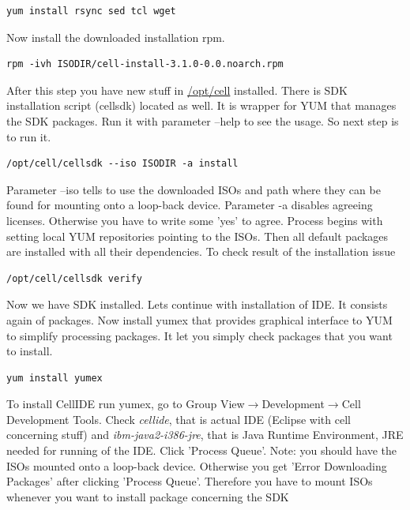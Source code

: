 \begin{verbatim}
yum install rsync sed tcl wget
\end{verbatim}

Now install the downloaded installation rpm.

\begin{verbatim}
rpm -ivh ISODIR/cell-install-3.1.0-0.0.noarch.rpm
\end{verbatim}

After this step you have new stuff in \url{/opt/cell} installed. There is SDK installation script (cellsdk) located as well.
It is wrapper for YUM that manages the SDK packages.
Run it with parameter --help to see the usage.
So next step is to run it.

\begin{verbatim}
/opt/cell/cellsdk --iso ISODIR -a install
\end{verbatim}

Parameter --iso tells to use the downloaded ISOs and path where they can be found for mounting onto a loop-back device.
Parameter -a disables agreeing licenses.
Otherwise you have to write some 'yes' to agree.
Process begins with setting local YUM repositories pointing to the ISOs.
Then all default packages are installed with all their dependencies.
To check result of the installation issue

\begin{verbatim}
/opt/cell/cellsdk verify
\end{verbatim}

Now we have SDK installed.
Lets continue with installation of IDE.
It consists again of packages.
Now install yumex that provides graphical interface to YUM to simplify processing packages.
It let you simply check packages that you want to install.

\begin{verbatim}
yum install yumex
\end{verbatim}

To install CellIDE run yumex, go to Group View$\rightarrow$Development$\rightarrow$Cell Development Tools.
Check \textit{cellide}, that is actual IDE (Eclipse with cell concerning stuff) and \textit{ibm-java2-i386-jre}, that is Java Runtime Environment, JRE needed for running of the IDE.
Click 'Process Queue'. Note: you should have the ISOs mounted onto a loop-back device.
Otherwise you get 'Error Downloading Packages' after clicking 'Process Queue'.
Therefore you have to mount ISOs whenever you want to install package concerning the SDK

